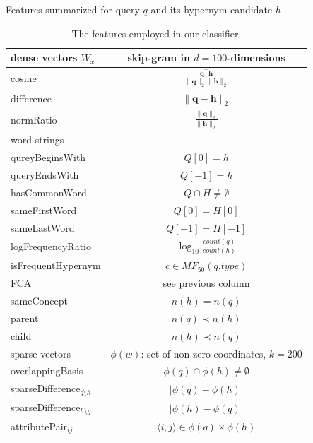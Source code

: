 \documentclass{beamer}
\newlength{\onecolwid}
\begin{document}
\begin{frame}[t]
\begin{columns}[t]
\begin{column}{\onecolwid}
    \bigskip
    \begin{block}{Features summarized}{ for query $q$ and its hypernym candidate $h$ }
      \begin{table}
        \begin{tabular}{lc}
          \toprule
          \alert{dense vectors $W_x$}   & skip-gram in $d=100$-dimensions
          \\ \midrule
          {cosine}            & $\frac{\mathbf{q}^\intercal \mathbf{h}}{\lVert \mathbf{q} \rVert_2\lVert \mathbf{h} \rVert_2}$ \\ %
          {difference}        & $\lVert \mathbf{q} - \mathbf{h} \rVert_2$ \\ %
          {normRatio}         & $\frac{\lVert \mathbf{q}\rVert_2}{\lVert
          \mathbf{h} \rVert_2}$ \\ %
          \midrule 
          \alert{word strings}   & \\ 
          \midrule
          {qureyBeginsWith}   & $Q[0] = h$ \\ %
          {queryEndsWith}     & $Q[-1] = h$ \\
          {hasCommonWord} & $Q \cap H \neq \emptyset$ \\ %
          {sameFirstWord}        & $Q[0] = H[0]$ \\ %
          {sameLastWord}        & $Q[-1] = H[-1]$ \\
          {logFrequencyRatio} & $\log_{10}\frac{count(q)}{count(h)}$ \\ %
          {isFrequentHypernym}\footnotemark & $c \in MF_{50}(q.type)$\\
          \midrule 
          \alert{FCA} & see previous column    \\ 
          \midrule
          sameConcept & $n(h)=n(q)$ \\
          parent  & $n(q)\prec n(h)$ \\
          child  & $n(h)\prec n(q)$ \\
          \midrule 
          \alert{sparse vectors}   &  $\phi(w)$: set of non-zero coordinates,
          $k=200$  \\
          \midrule
          {overlappingBasis}  & $\phi(q) \cap \phi(h) \neq \emptyset$ \\ %
          {sparseDifference$_{q\setminus h}$} & $\lvert \phi(q) - \phi(h) \rvert$ \\ %
          {sparseDifference$_{h\setminus q}$} & $\lvert \phi(h) - \phi(q) \rvert$ \\
          attributePair$_{ij}$      & $\langle i,j\rangle\in\phi(q)\times\phi(h)$ \\ %
          \bottomrule
        \end{tabular}
        \caption{The features employed in our classifier. \\
        }
        \label{table:core_features}
      \end{table}


\end{block}
\end{column}
\end{columns}
\end{frame}
\end{document}
